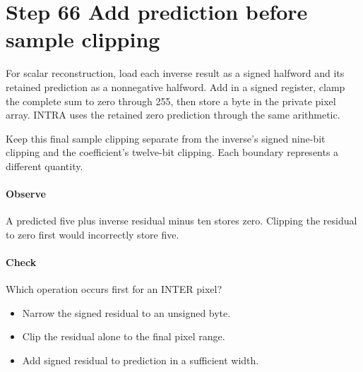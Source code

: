 \section{Step 66 Add prediction before sample clipping}\label{h263-block-s06}
For scalar reconstruction, load each inverse result as a signed halfword and its
retained prediction as a nonnegative halfword. Add in a signed register, clamp
the complete sum to zero through 255, then store a byte in the private pixel
array. INTRA uses the retained zero prediction through the same arithmetic.

Keep this final sample clipping separate from the inverse's signed nine-bit
clipping and the coefficient's twelve-bit clipping. Each boundary represents a
different quantity.

\paragraph{Observe} A predicted five plus inverse residual minus ten stores zero.
Clipping the residual to zero first would incorrectly store five.
\paragraph{Check} Which operation occurs first for an INTER pixel?
\begin{itemize}
  \item[A.] Narrow the signed residual to an unsigned byte.
  \item[B.] Clip the residual alone to the final pixel range.
  \item[C.] Add signed residual to prediction in a sufficient width.
\end{itemize}
